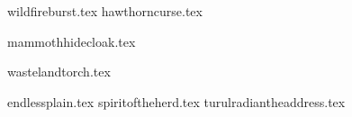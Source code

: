 
\raggedcolumns
\begin{multicols}{2}

\subtitle{\weaponenchantments}
\startsortedpricelist

{wildfireburst.tex}
{hawthorncurse.tex}

\endsortedpricelist


\subtitle{\armourenchantments}
\startsortedpricelist

{mammothhidecloak.tex}

\endsortedpricelist


\subtitle{\bannerenchantments}
\startsortedpricelist

{wastelandtorch.tex}

\endsortedpricelist


\subtitle{\artefacts}
\startsortedpricelist

{endlessplain.tex}
{spiritoftheherd.tex}
{turulradiantheaddress.tex}

\endsortedpricelist
\end{multicols}
